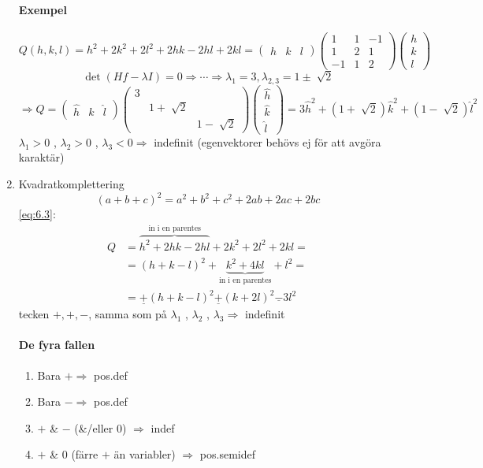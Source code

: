 \documentclass[a4paper]{article}
\let\oldsqrt\sqrt
\renewcommand*{\sqrt}[2][\ ]{\oldsqrt[#1]{#2} }
\begin{document}
\begin{enumerate}
\paragraph{Exempel}
\begin{equation}\label{eq:6.3}
	Q(h,k,l) = h^2 + 2k^2 + 2l^2 + 2hk - 2hl + 2kl = 
	\begin{pmatrix}
		h & k & l
	\end{pmatrix}
	\begin{pmatrix}
		1 & 1 & -1 \\
		1 & 2 & 1 \\
		-1 & 1 & 2
	\end{pmatrix}
	\begin{pmatrix}
		h \\
		k \\
		l
	\end{pmatrix}
\end{equation}
$$
	\det(Hf - \lambda I) = 0 \Rightarrow \cdots \Rightarrow \lambda_1 = 3, \lambda_{2,3} = 1 \pm \sqrt{2}
$$
$$
	\Rightarrow Q = 
	\begin{pmatrix}
		\hat{h} & \hat{k} & \hat{l}
	\end{pmatrix}
	\begin{pmatrix}
		3 & & \\
		& 1+\sqrt{2} & \\
		& & 1-\sqrt{2}
	\end{pmatrix}
	\begin{pmatrix}
		\hat{h} \\
		\hat{k} \\
		\hat{l}
	\end{pmatrix}
	= 3\hat{h}^2 + (1+\sqrt{2})\hat{k}^2 + (1-\sqrt{2})\hat{l}^2
$$
$\lambda_1 > 0$ , $\lambda_2 > 0$ , $\lambda_3 < 0 \Rightarrow$ indefinit (egenvektorer behövs ej för att avgöra karaktär)

\newpage
\item Kvadratkomplettering
$$
	(a+b+c)^2 = a^2 + b^2 + c^2 + 2ab + 2ac + 2bc
$$
\eqref{eq:6.3}:
\begin{align*}
	Q &= \overbrace{h^2 + 2hk - 2hl}^{\text{in i en parentes}} + 2k^2 + 2l^2 + 2kl = \\
	  &= (h+k-l)^2 + \underbrace{k^2 + 4kl}_{\text{in i en parentes}} + l^2 = \\
	  &= \underline{+}(h+k-l)^2 \underline{+} (k+2l)^2 \underline{-} 3l^2
\end{align*}
tecken $+, +, -$, samma som på $\lambda_1$ , $\lambda_2$ , $\lambda_3 \Rightarrow$ indefinit

\paragraph{De fyra fallen}
\begin{enumerate}
\item Bara $+ \Rightarrow$ pos.def
\item Bara $- \Rightarrow$ pos.def
\item $+$ \& $-$ (\&/eller 0) $\Rightarrow$ indef
\item $+$ \& $0$ (färre $+$ än variabler) $\Rightarrow$ pos.semidef
\end{enumerate}
\end{enumerate}
\end{document}

